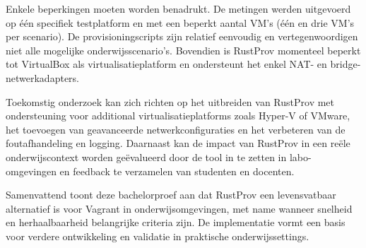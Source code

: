 Enkele beperkingen moeten worden benadrukt. De metingen werden uitgevoerd op één specifiek testplatform en met een beperkt aantal VM's (één en drie VM's per scenario). De provisioningscripts zijn relatief eenvoudig en vertegenwoordigen niet alle mogelijke onderwijsscenario's. Bovendien is RustProv momenteel beperkt tot VirtualBox als virtualisatieplatform en ondersteunt het enkel NAT- en bridge-netwerkadapters.

Toekomstig onderzoek kan zich richten op het uitbreiden van RustProv met ondersteuning voor additional virtualisatieplatforms zoals Hyper-V of VMware, het toevoegen van geavanceerde netwerkconfiguraties en het verbeteren van de foutafhandeling en logging. Daarnaast kan de impact van RustProv in een reële onderwijscontext worden geëvalueerd door de tool in te zetten in labo-omgevingen en feedback te verzamelen van studenten en docenten.

Samenvattend toont deze bachelorproef aan dat RustProv een levensvatbaar alternatief is voor Vagrant in onderwijsomgevingen, met name wanneer snelheid en herhaalbaarheid belangrijke criteria zijn. De implementatie vormt een basis voor verdere ontwikkeling en validatie in praktische onderwijssettings.